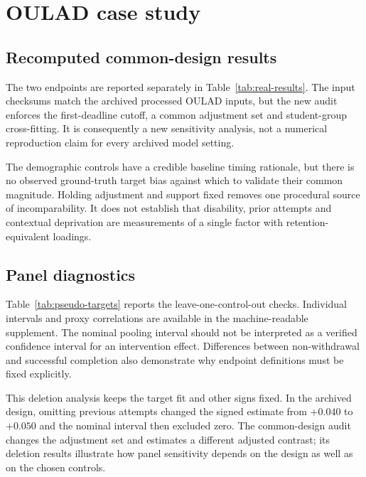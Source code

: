 \section{OULAD case study}

\subsection{Recomputed common-design results}

The two endpoints are reported separately in Table~\ref{tab:real-results}. The input checksums match the archived processed OULAD inputs, but the new audit enforces the first-deadline cutoff, a common adjustment set and student-group cross-fitting. It is consequently a new sensitivity analysis, not a numerical reproduction claim for every archived model setting.



The demographic controls have a credible baseline timing rationale, but there is no observed ground-truth target bias against which to validate their common magnitude. Holding adjustment and support fixed removes one procedural source of incomparability. It does not establish that disability, prior attempts and contextual deprivation are measurements of a single factor with retention-equivalent loadings.

\subsection{Panel diagnostics}

Table~\ref{tab:pseudo-targets} reports the leave-one-control-out checks. Individual intervals and proxy correlations are available in the machine-readable supplement. The nominal pooling interval should not be interpreted as a verified confidence interval for an intervention effect. Differences between non-withdrawal and successful completion also demonstrate why endpoint definitions must be fixed explicitly.



This deletion analysis keeps the target fit and other signs fixed. In the archived design, omitting previous attempts changed the signed estimate from $+0.040$ to $+0.050$ and the nominal interval then excluded zero. The common-design audit changes the adjustment set and estimates a different adjusted contrast; its deletion results illustrate how panel sensitivity depends on the design as well as on the chosen controls.

